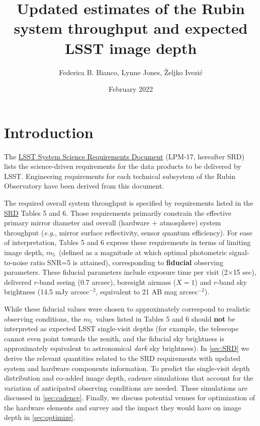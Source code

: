 \documentclass[PST,authoryear,toc]{lsstdoc}
\title{Updated estimates of the Rubin system throughput and expected LSST image depth}
\author{Federica B. Bianco, Lynne Jones, \v{Z}eljko Ivezi\'{c}}
\date{February 2022}
\date{\vcsDate}
\newcommand{\mf}{\ensuremath{m_5}}
\begin{document}
\maketitle


\section{Introduction}

The \href{https://docushare.lsst.org/docushare/dsweb/Get/LPM-17}{{LSST System Science Requirements Document}} (LPM-17, hereafter SRD) lists the science-driven requirements for the data products to be delivered by LSST. 
Engineering requirements for each technical subsystem of the Rubin Observatory have been derived from this document. 

The required overall system throughput is specified by requirements listed in the \href{https://docushare.lsst.org/docushare/dsweb/Get/LPM-17}{{SRD}} Tables 5 and 6. 
Those requirements primarily constrain the effective primary mirror diameter and overall (hardware $+$ atmosphere) 
system throughput ({\it e.g.}, mirror surface reflectivity, sensor quantum efficiency). For ease of interpretation, 
Tables 5 and 6 express these requirements in terms of limiting image depth, \mf\ (defined as a magnitude at which 
optimal photometric signal-to-noise ratio SNR=5 is attained), corresponding to {\bf fiducial} observing parameters. These fiducial parameters 
include exposure time per visit (2$\times$15 sec), delivered $r$-band seeing (0.7 arcsec), boresight airmass ($X=1$) and $r$-band sky brightness (14.5 mJy arcsec$^{-2}$, equivalent to 
21 AB mag arcsec$^{-2}$). 

While these fiducial values were chosen to approximately correspond to realistic observing conditions, the \mf\ values listed in Tables 5 and 6 should {\bf not} be interpreted as expected LSST single-visit depths (for example, 
the telescope cannot even point towards the zenith, and the fiducial sky brightness is approximately equivalent to 
astronomical {\it dark} sky brightness). In \autoref{sec:SRD} we derive the relevant quantities related to the SRD requirements with updated system and hardware components information. To predict the single-visit depth distribution and co-added image depth, 
cadence simulations that account for the variation of anticipated observing conditions are needed. These simulations are discussed 
in \autoref{sec:cadence}. Finally, we discuss potential venues for optimization of the hardware elements and survey and the impact they would have on image depth in \autoref{sec:optimize}.
\end{document}
